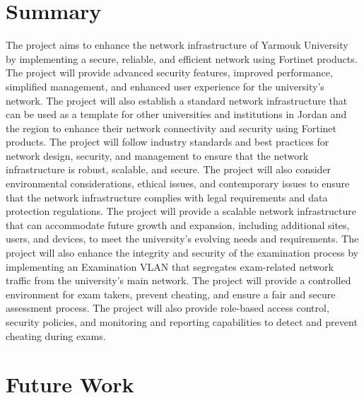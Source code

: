\documentclass[12pt]{report}
\begin{document}
\section{Summary}
The project aims to enhance the network infrastructure of Yarmouk University by implementing a secure, reliable, and efficient network using Fortinet products. The project will provide advanced security features, improved performance, simplified management, and enhanced user experience for the university's network. The project will also establish a standard network infrastructure that can be used as a template for other universities and institutions in Jordan and the region to enhance their network connectivity and security using Fortinet products. The project will follow industry standards and best practices for network design, security, and management to ensure that the network infrastructure is robust, scalable, and secure. The project will also consider environmental considerations, ethical issues, and contemporary issues to ensure that the network infrastructure complies with legal requirements and data protection regulations. The project will provide a scalable network infrastructure that can accommodate future growth and expansion, including additional sites, users, and devices, to meet the university's evolving needs and requirements. The project will also enhance the integrity and security of the examination process by implementing an Examination VLAN that segregates exam-related network traffic from the university's main network. The project will provide a controlled environment for exam takers, prevent cheating, and ensure a fair and secure assessment process. The project will also provide role-based access control, security policies, and monitoring and reporting capabilities to detect and prevent cheating during exams.

\section{Future Work}
\end{document}

